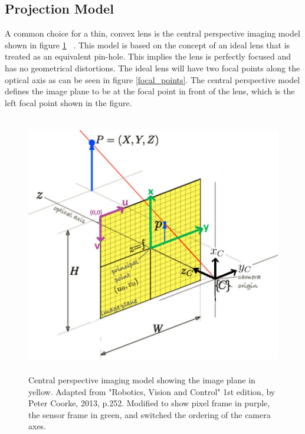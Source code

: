  \subsection{Projection Model}
 
 A common choice for a thin, convex lens is the central perspective imaging model shown in figure \ref{projection_model} ~\citep{Coorke:2013}. This model is based on the concept of an ideal lens that is treated as an equivalent pin-hole.  This implies the lens is perfectly focused and has no geometrical distortions.  The ideal lens will have two focal points along the optical axis as can be seen in figure \ref{focal_points}.  The central perspective model defines the image plane to be at the focal point in front of the lens, which is the left focal point shown in the figure.  
 
 \begin{figure}
 	\centering
     \includegraphics[height=4.5in]{figures/projection_model.jpg}
     \caption[Projection model]{Central perspective imaging model showing the image plane in yellow.  Adapted from "Robotics, Vision and Control" 1st edition, by Peter Coorke, 2013, p.252. Modified to show pixel frame in purple, the sensor frame in green, and switched the ordering of the camera axes.}
     \label{projection_model}
 \end{figure}

